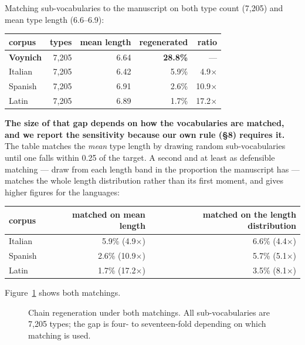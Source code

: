 \documentclass[11pt,a4paper]{article}
\begin{document}
Matching sub-vocabularies to the manuscript on both type count (7,205) and mean type length (6.6--6.9):


\begin{table}[htbp]\centering\small
\begin{tabular}{@{}lrrrr@{}}
\toprule
corpus & types & mean length & regenerated & ratio \\
\midrule
\textbf{Voynich} & 7,205 & 6.64 & \textbf{28.8\%} & --- \\
Italian & 7,205 & 6.42 & 5.9\% & 4.9$\times$ \\
Spanish & 7,205 & 6.91 & 2.6\% & 10.9$\times$ \\
Latin & 7,205 & 6.89 & 1.7\% & 17.2$\times$ \\
\bottomrule
\end{tabular}
\end{table}


\textbf{The size of that gap depends on how the vocabularies are matched, and we report the sensitivity because our own rule (\S8) requires it.} The table matches the \emph{mean} type length by drawing random sub-vocabularies until one falls within 0.25 of the target. A second and at least as defensible matching --- draw from each length band in the proportion the manuscript has --- matches the whole length distribution rather than its first moment, and gives higher figures for the languages:


\begin{table}[htbp]\centering\small
\begin{tabular}{@{}lrr@{}}
\toprule
corpus & matched on mean length & matched on the length distribution \\
\midrule
Italian & 5.9\% (4.9$\times$) & 6.6\% (4.4$\times$) \\
Spanish & 2.6\% (10.9$\times$) & 5.7\% (5.1$\times$) \\
Latin & 1.7\% (17.2$\times$) & 3.5\% (8.1$\times$) \\
\bottomrule
\end{tabular}
\end{table}


Figure~\ref{fig:1} shows both matchings.


\begin{figure}[htbp]\centering

\caption{Chain regeneration under both matchings. All sub-vocabularies are 7,205 types; the gap is four- to seventeen-fold depending on which matching is used.}
\label{fig:1}
\end{figure}
\end{document}
